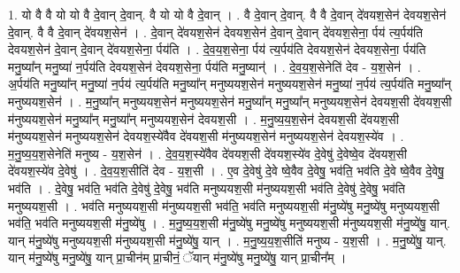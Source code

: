 \documentclass[17pt]{extarticle}
\begin{document}
1. यो वै वै यो यो वै दे॒वान् दे॒वान्. वै यो यो वै दे॒वान् । . वै दे॒वान् दे॒वान्. वै वै दे॒वान् दे॑वयश॒सेन॑ देवयश॒सेन॑ दे॒वान्. वै वै दे॒वान् दे॑वयश॒सेन॑ । . दे॒वान् दे॑वयश॒सेन॑ देवयश॒सेन॑ दे॒वान् दे॒वान् दे॑वयश॒सेना॒ र्पय॑ त्य॒र्पय॑ति देवयश॒सेन॑ दे॒वान् दे॒वान् दे॑वयश॒सेना॒ र्पय॑ति । . दे॒व॒य॒श॒सेना॒ र्पय॑ त्य॒र्पय॑ति देवयश॒सेन॑ देवयश॒सेना॒ र्पय॑ति मनु॒ष्या᳚न् मनु॒ष्या॑ न॒र्पय॑ति देवयश॒सेन॑ देवयश॒सेना॒ र्पय॑ति मनु॒ष्यान्॑ । . दे॒व॒य॒श॒सेनेति॑ देव - य॒श॒सेन॑ । . अ॒र्पय॑ति मनु॒ष्या᳚न् मनु॒ष्या॑ न॒र्पय॑ त्य॒र्पय॑ति मनु॒ष्या᳚न् मनुष्ययश॒सेन॑ मनुष्ययश॒सेन॑ मनु॒ष्या॑ न॒र्पय॑ त्य॒र्पय॑ति मनु॒ष्या᳚न् मनुष्ययश॒सेन॑ । . म॒नु॒ष्या᳚न् मनुष्ययश॒सेन॑ मनुष्ययश॒सेन॑ मनु॒ष्या᳚न् मनु॒ष्या᳚न् मनुष्ययश॒सेन॑ देवयश॒सी दे॑वयश॒सी म॑नुष्ययश॒सेन॑ मनु॒ष्या᳚न् मनु॒ष्या᳚न् मनुष्ययश॒सेन॑ देवयश॒सी । . म॒नु॒ष्य॒य॒श॒सेन॑ देवयश॒सी दे॑वयश॒सी म॑नुष्ययश॒सेन॑ मनुष्ययश॒सेन॑ देवयश॒स्ये॑वैव दे॑वयश॒सी म॑नुष्ययश॒सेन॑ मनुष्ययश॒सेन॑ देवयश॒स्ये॑व । . म॒नु॒ष्य॒य॒श॒सेनेति॑ मनुष्य - य॒श॒सेन॑ । . दे॒व॒य॒श॒स्ये॑वैव दे॑वयश॒सी दे॑वयश॒स्ये॑व दे॒वेषु॑ दे॒वेष्वे॒व दे॑वयश॒सी दे॑वयश॒स्ये॑व दे॒वेषु॑ । . दे॒व॒य॒श॒सीति॑ देव - य॒श॒सी । . ए॒व दे॒वेषु॑ दे॒वे ष्वे॒वैव दे॒वेषु॒ भव॑ति॒ भव॑ति दे॒वे ष्वे॒वैव दे॒वेषु॒ भव॑ति । . दे॒वेषु॒ भव॑ति॒ भव॑ति दे॒वेषु॑ दे॒वेषु॒ भव॑ति मनुष्ययश॒सी म॑नुष्ययश॒सी भव॑ति दे॒वेषु॑ दे॒वेषु॒ भव॑ति मनुष्ययश॒सी । . भव॑ति मनुष्ययश॒सी म॑नुष्ययश॒सी भव॑ति॒ भव॑ति मनुष्ययश॒सी म॑नु॒ष्ये॑षु मनु॒ष्ये॑षु मनुष्ययश॒सी भव॑ति॒ भव॑ति मनुष्ययश॒सी म॑नु॒ष्ये॑षु । . म॒नु॒ष्य॒य॒श॒सी म॑नु॒ष्ये॑षु मनु॒ष्ये॑षु मनुष्ययश॒सी म॑नुष्ययश॒सी म॑नु॒ष्ये॑षु॒ यान्. यान् म॑नु॒ष्ये॑षु मनुष्ययश॒सी म॑नुष्ययश॒सी म॑नु॒ष्ये॑षु॒ यान् । . म॒नु॒ष्य॒य॒श॒सीति॑ मनुष्य - य॒श॒सी । . म॒नु॒ष्ये॑षु॒ यान्. यान् म॑नु॒ष्ये॑षु मनु॒ष्ये॑षु॒ यान् प्रा॒चीन॑म् प्रा॒चीनं॒ ॅयान् म॑नु॒ष्ये॑षु मनु॒ष्ये॑षु॒ यान् प्रा॒चीन᳚म् । \newline
\end{document}
